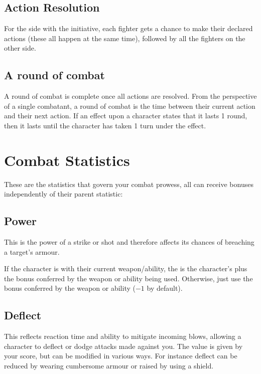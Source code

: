 \documentclass[a4paper,10pt,oneside]{book}
\newcommand{\dicenoprof}{-1}
\newcommand{\textlf}[1]{\textbf{\titlecap{#1}}}
\begin{document}
\subsection{Action Resolution}
For the side with the initiative, each fighter gets a chance to make their declared actions (these all happen at the same time), followed by all the fighters on the other side.  

\subsection{A round of combat}
A round of combat is complete once all actions are resolved. From the perspective of a single combatant, a round of combat is the time between their current action and their next action. If an effect upon a character states that it lasts 1 round, then it lasts until the character has taken 1 turn under the effect.


\section{Combat Statistics}
\label{sec:comstat}
These are the statistics that govern your combat prowess, all can receive bonuses independently of their parent statistic:

\subsection{Power}
This is the power of a strike or shot and therefore affects its chances of breaching a target's armour. 

If the character is \textlf{proficient} with their current weapon/ability, the \textlf{Power} is the character's \textlf{might} plus the bonus conferred by the weapon or ability being used. Otherwise, just use the bonus conferred by the weapon or ability ($\dicenoprof$ by default).

\subsection{Deflect}
This reflects reaction time and ability to mitigate incoming blows, allowing a character to deflect or dodge attacks made against you. The value is given by your \textlf{Cunning} score, but can be modified in various ways. For instance deflect can be reduced by wearing cumbersome armour or raised by using a shield.
\end{document}
